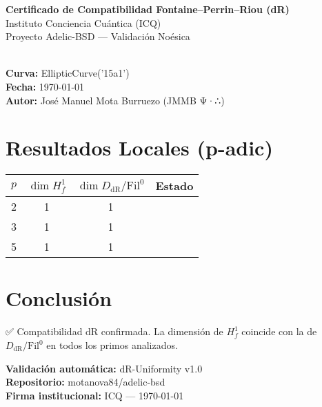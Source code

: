 \documentclass[12pt]{article}
\newcommand{\OK}{\textcolor{green}{\checkmark}}
\begin{document}
\begin{center}
{\LARGE \textbf{Certificado de Compatibilidad Fontaine–Perrin–Riou (dR)}}\\[4mm]
{\large Instituto Conciencia Cuántica (ICQ)}\\[2mm]
{\large Proyecto Adelic-BSD — Validación Noésica}\\[1cm]
\hrulefill\\[0.6cm]
\end{center}

\noindent
\textbf{Curva:} EllipticCurve('15a1')\\
\textbf{Fecha:} \today\\
\textbf{Autor:} José Manuel Mota Burruezo (JMMB Ψ·∴)\\[0.4cm]

\section*{Resultados Locales (p-adic)}
\begin{tabular}{cccc}
\toprule
$p$ & $\dim H^1_f$ & $\dim D_{\mathrm{dR}}/\mathrm{Fil}^0$ & Estado \\
\midrule
2 & 1 & 1 & \OK\\
3 & 1 & 1 & \OK\\
5 & 1 & 1 & \OK\\
\bottomrule
\end{tabular}

\vspace{0.5cm}
\section*{Conclusión}
\noindent
✅ Compatibilidad dR confirmada. La dimensión de $H^1_f$ coincide con la de $D_{\mathrm{dR}}/\mathrm{Fil}^0$ en todos los primos analizados.

\vspace{1cm}
\begin{flushright}
\textbf{Validación automática:} dR-Uniformity v1.0\\
\textbf{Repositorio:} motanova84/adelic-bsd\\
\textbf{Firma institucional:} ICQ — \today
\end{flushright}
\end{document}
